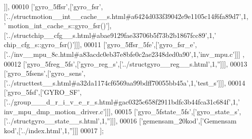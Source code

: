 \begin{DoxyCode}
      ]],
00010   [\textcolor{stringliteral}{'gyro\_5ffsr'},[\textcolor{stringliteral}{'gyro\_fsr'},[\textcolor{stringliteral}{'../structmotion\_\_int\_\_cache\_\_s.html#a6424d033f39042e9e1105c14f6fa89d7'},1,\textcolor{stringliteral}{'
      motion\_int\_cache\_s::gyro\_fsr()'}],[\textcolor{stringliteral}{'../structchip\_\_cfg\_\_s.html#abae9129fae33706b5f73b2b1867fcc89'},1,\textcolor{stringliteral}{'
      chip\_cfg\_s::gyro\_fsr()'}]]],
00011   [\textcolor{stringliteral}{'gyro\_5ffsr\_5fe'},[\textcolor{stringliteral}{'gyro\_fsr\_e'},[\textcolor{stringliteral}{'../inv\_\_mpu\_8c.html#a83acdc0eb37e8bfe0c2ae2348ded0a90'},1,\textcolor{stringliteral}{'inv\_mpu.c'}]]]
      ,
00012   [\textcolor{stringliteral}{'gyro\_5freg\_5fs'},[\textcolor{stringliteral}{'gyro\_reg\_s'},[\textcolor{stringliteral}{'../structgyro\_\_reg\_\_s.html'},1,\textcolor{stringliteral}{''}]]],
00013   [\textcolor{stringliteral}{'gyro\_5fsens'},[\textcolor{stringliteral}{'gyro\_sens'},[\textcolor{stringliteral}{'../structtest\_\_s.html#a32da1174cf6569aa99bdff70055bb45a'},1,\textcolor{stringliteral}{'test\_s'}]]],
00014   [\textcolor{stringliteral}{'gyro\_5fsf'},[\textcolor{stringliteral}{'GYRO\_SF'},[\textcolor{stringliteral}{'../group\_\_\_d\_r\_i\_v\_e\_r\_s.html#gac0325c658f2911bdfc3b44fca31c684f'},1,\textcolor{stringliteral}{'
      inv\_mpu\_dmp\_motion\_driver.c'}]]],
00015   [\textcolor{stringliteral}{'gyro\_5fstate\_5fs'},[\textcolor{stringliteral}{'gyro\_state\_s'},[\textcolor{stringliteral}{'../structgyro\_\_state\_\_s.html'},1,\textcolor{stringliteral}{''}]]],
00016   [\textcolor{stringliteral}{'gemensam\_20kod'},[\textcolor{stringliteral}{'Gemensam kod'},[\textcolor{stringliteral}{'../index.html'},1,\textcolor{stringliteral}{''}]]]
00017 ];
\end{DoxyCode}
